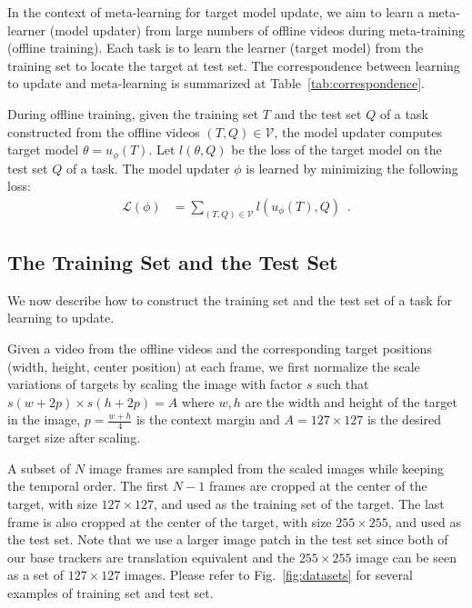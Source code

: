 \documentclass[journal]{IEEEtran}
\begin{document}
In the context of meta-learning for target model update, we aim to learn a meta-learner (model updater) from large numbers of offline videos during meta-training (offline training). Each task is to learn the learner (target model) from the training set to locate the target at test set. The correspondence between learning to update and meta-learning is summarized at Table~\ref{tab:correspondence}.

During offline training, given the training set $T$ and the test set $Q$ of a task constructed from the offline videos $(T, Q) \in \mathcal{V}$, the model updater computes target model $\theta = u_\phi(T)$. Let $l(\theta, Q)$ be the loss of the target model on the test set $Q$ of a task. The model updater $\phi$ is learned by minimizing the following loss: 
\begin{equation}
	\begin{aligned} \label{eq:meta-loss}
		\mathcal{L}(\phi) &= \sum_{(T, Q) \in \mathcal{V}} l(u_{\phi}(T), Q) \enspace .
	\end{aligned}
\end{equation}

\subsection{The Training Set and the Test Set}
We now describe how to construct the training set and the test set of a task for learning to update.

Given a video from the offline videos and the corresponding target positions (width, height, center position) at each frame, we first normalize the scale variations of targets by scaling the image with factor $s$ such that $s(w + 2p) \times s(h + 2p) = A$ where $w, h$ are the width and height of the target in the image, $p = \frac{w + h}{4}$ is the context margin and $A = 127 \times 127$ is the desired target size after scaling.

A subset of $N$ image frames are sampled from the scaled images while keeping the temporal order. The first $N - 1$ frames are cropped at the center of the target, with size $127\times 127$, and used as the training set of the target. The last frame is also cropped at the center of the target, with size $255\times 255$, and used as the test set. Note that we use a larger image patch in the test set since both of our base trackers are translation equivalent and the $255\times 255$ image can be seen as a set of $127\times 127$ images. Please refer to Fig.~\ref{fig:datasets} for several examples of training set and test set.
\end{document}
